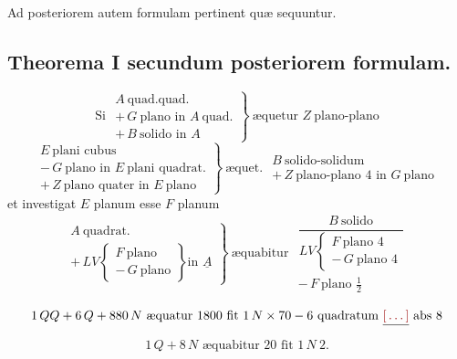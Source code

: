 \documentclass[11pt,a4paper]{article}
\begin{document}
Ad posteriorem autem formulam pertinent quæ sequuntur.

\subsection*{Theorema I secundum posteriorem formulam.}

\[ \text{Si } \left.\begin{array}{l} A\ \text{quad.quad.} \\ +\,G\ \text{plano in } A\ \text{quad.} \\ +\,B\ \text{solido in } A \end{array}\right\}\ \text{æquetur } Z\ \text{plano-plano} \]
\[ \left.\begin{array}{l} E\ \text{plani cubus} \\ -\,G\ \text{plano in } E\ \text{plani quadrat.} \\ +\,Z\ \text{plano quater in } E\ \text{plano} \end{array}\right\}\ \text{æquet. } \begin{array}{l} B\ \text{solido-solidum} \\ +\,Z\ \text{plano-plano } 4 \text{ in } G\ \text{plano} \end{array} \]
et investigat $E$ planum esse $F$ planum
\[ \left.\begin{array}{l} A\ \text{quadrat.} \\ +\,LV \left\{\begin{array}{l} F\ \text{plano} \\ -\,G\ \text{plano} \end{array}\right\} \text{in } \underline{A} \end{array}\right\}\ \text{æquabitur } \begin{array}{l} \dfrac{B\ \text{solido}}{LV \left\{\begin{array}{l} F\ \text{plano } 4 \\ -\,G\ \text{plano } 4 \end{array}\right.} \\ -\,F\ \text{plano } \frac{1}{2} \end{array} \]

\[ 1\,QQ + 6\,Q + 880\,N \text{ æquatur } 1800 \text{ fit } 1\,N \times 70 - 6 \text{ quadratum } \struck{\ill{}} \text{ abs } 8 \]
\[ 1\,Q + 8\,N \text{ æquabitur } 20 \text{ fit } 1\,N\ 2. \]
\end{document}
